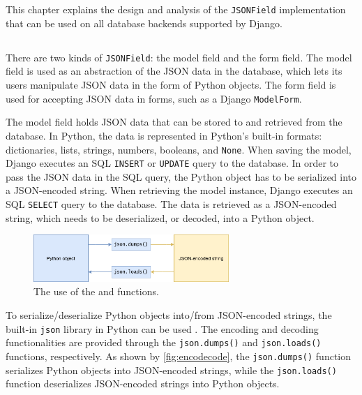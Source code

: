 \chapter{\babTiga}

This chapter explains the design and analysis of the \verb|JSONField|
implementation that can be used on all database backends supported by Django.

\section{}

There are two kinds of \verb|JSONField|: the model field and the form field.
The model field is used as an abstraction of the JSON data in the database,
which lets its users manipulate JSON data in the form of Python objects.
The form field is used for accepting JSON data in forms, such as a Django
\verb|ModelForm|.

The model field holds JSON data that can be stored to and retrieved from the
database. In Python, the data is represented in Python's built-in formats:
dictionaries, lists, strings, numbers, booleans, and \verb|None|. When saving
the model, Django executes an SQL \verb|INSERT| or \verb|UPDATE| query to the
database. In order to pass the JSON data in the SQL query, the Python object
has to be serialized into a JSON-encoded string. When retrieving the model
instance, Django executes an SQL \verb|SELECT| query to the database. The data
is retrieved as a JSON-encoded string, which needs to be deserialized, or
decoded, into a Python object.

\begin{figure}
	\centering
    \includegraphics[width=0.66\textwidth]{pics/encodecode.png}
	\caption{The use of the  and 
	functions.}
	\label{fig:encodecode}
\end{figure}

To serialize/deserialize Python objects into/from JSON-encoded strings, the
built-in \verb|json| library in Python can be used \cite{python:json}. The
encoding and decoding functionalities are provided through the
\verb|json.dumps()| and \verb|json.loads()| functions, respectively. As shown
by \autoref{fig:encodecode}, the \verb|json.dumps()| function serializes Python
objects into JSON-encoded strings, while the \verb|json.loads()| function
deserializes JSON-encoded strings into Python objects.

